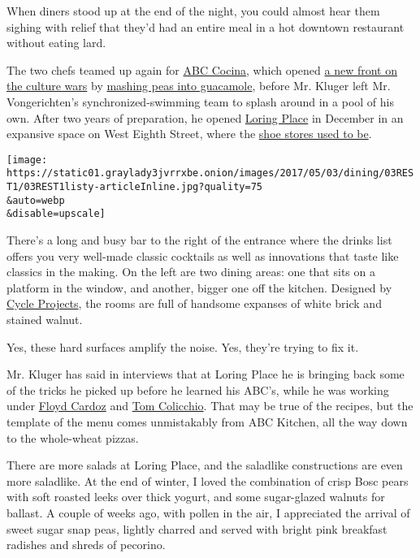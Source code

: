 When diners stood up at the end of the night, you could almost hear them
sighing with relief that they'd had an entire meal in a hot downtown
restaurant without eating lard.

The two chefs teamed up again for
\href{http://www.nytimes3xbfgragh.onion/2013/07/31/dining/reviews/restaurant-review-abc-cocina-in-manhattan.html}{ABC
Cocina}, which opened
\href{http://www.slate.com/blogs/browbeat/2015/07/02/new_york_times_pea_guacamole_controversy_a_deep_analysis_of_the_tweet_that.html}{a
new front on the culture wars} by
\href{https://cooking.nytimes3xbfgragh.onion/recipes/1015047-green-pea-guacamole?smid=tw-nytimes}{mashing
peas into guacamole}, before Mr. Kluger left Mr. Vongerichten's
synchronized-swimming team to splash around in a pool of his own. After
two years of preparation, he opened
\href{https://www.loringplacenyc.com/}{Loring Place} in December in an
expansive space on West Eighth Street, where the
\href{http://lostnewyorkcity.blogspot.com/2011/02/goodbye-shoe-row.html}{shoe
stores used to be}.

\texttt{[image: https://static01.graylady3jvrrxbe.onion/images/2017/05/03/dining/03REST1/03REST1listy-articleInline.jpg?quality=75\\\&auto=webp\\\&disable=upscale]}

There's a long and busy bar to the right of the entrance where the
drinks list offers you very well-made classic cocktails as well as
innovations that taste like classics in the making. On the left are two
dining areas: one that sits on a platform in the window, and another,
bigger one off the kitchen. Designed by
\href{http://www.cycleprojects.com/}{Cycle Projects}, the rooms are full
of handsome expanses of white brick and stained walnut.

Yes, these hard surfaces amplify the noise. Yes, they're trying to fix
it.

Mr. Kluger has said in interviews that at Loring Place he is bringing
back some of the tricks he picked up before he learned his ABC's, while
he was working under
\href{http://www.nytimes3xbfgragh.onion/2011/12/21/dining/floyd-cardoz-the-chef-of-tabla-switches-cuisines-feed-me.html}{Floyd
Cardoz} and
\href{http://www.craftedhospitality.com/tom-colicchio/\#/about}{Tom
Colicchio}. That may be true of the recipes, but the template of the
menu comes unmistakably from ABC Kitchen, all the way down to the
whole-wheat pizzas.

There are more salads at Loring Place, and the saladlike constructions
are even more saladlike. At the end of winter, I loved the combination
of crisp Bosc pears with soft roasted leeks over thick yogurt, and some
sugar-glazed walnuts for ballast. A couple of weeks ago, with pollen in
the air, I appreciated the arrival of sweet sugar snap peas, lightly
charred and served with bright pink breakfast radishes and shreds of
pecorino.

